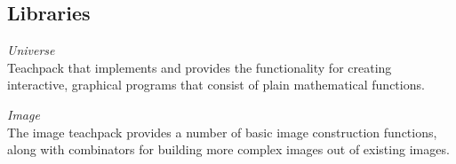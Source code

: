 \documentclass{article}
\begin{document}
\subsection{Libraries}
\hspace{0.5cm}\textit{Universe}\\
Teachpack that implements and provides the functionality for creating interactive, graphical programs that consist of plain mathematical functions.

\textit{Image}\\
The image teachpack provides a number of basic image construction functions, along with combinators for building more complex images out of existing images.

\end{document}
